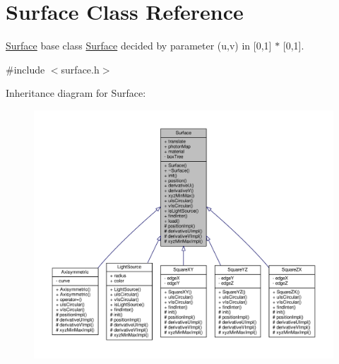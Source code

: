 \hypertarget{classSurface}{}\section{Surface Class Reference}
\label{classSurface}


\hyperlink{classSurface}{Surface} base class \hyperlink{classSurface}{Surface} decided by parameter (u,v) in \mbox{[}0,1\mbox{]} $\ast$ \mbox{[}0,1\mbox{]}.  




{\ttfamily \#include $<$surface.\+h$>$}



Inheritance diagram for Surface\+:\nopagebreak
\begin{figure}[H]
\begin{center}
\leavevmode
\includegraphics[width=350pt]{classSurface__inherit__graph}
\end{center}
\end{figure}


